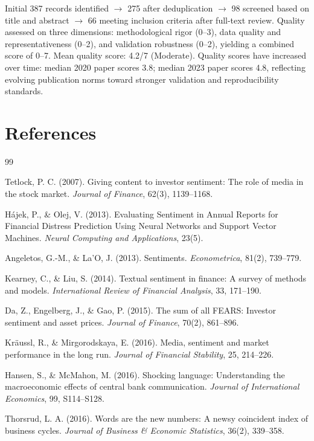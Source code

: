 \documentclass[11pt]{article}
\begin{document}
Initial 387 records identified $\to$ 275 after deduplication $\to$ 98 screened based on title and abstract $\to$ 66 meeting inclusion criteria after full-text review. Quality assessed on three dimensions: methodological rigor (0--3), data quality and representativeness (0--2), and validation robustness (0--2), yielding a combined score of 0--7. Mean quality score: 4.2/7 (Moderate). Quality scores have increased over time: median 2020 paper scores 3.8; median 2023 paper scores 4.8, reflecting evolving publication norms toward stronger validation and reproducibility standards.

\newpage
\section*{References}

\begin{thebibliography}{99}

 Tetlock, P. C. (2007). Giving content to investor sentiment: The role of media in the stock market. \textit{Journal of Finance}, 62(3), 1139--1168.

 Hájek, P., \& Olej, V. (2013). Evaluating Sentiment in Annual Reports for Financial Distress Prediction Using Neural Networks and Support Vector Machines. \textit{Neural Computing and Applications}, 23(5).

 Angeletos, G.-M., \& La'O, J. (2013). Sentiments. \textit{Econometrica}, 81(2), 739--779.

 Kearney, C., \& Liu, S. (2014). Textual sentiment in finance: A survey of methods and models. \textit{International Review of Financial Analysis}, 33, 171--190.

 Da, Z., Engelberg, J., \& Gao, P. (2015). The sum of all FEARS: Investor sentiment and asset prices. \textit{Journal of Finance}, 70(2), 861--896.

 Kräussl, R., \& Mirgorodskaya, E. (2016). Media, sentiment and market performance in the long run. \textit{Journal of Financial Stability}, 25, 214--226.

 Hansen, S., \& McMahon, M. (2016). Shocking language: Understanding the macroeconomic effects of central bank communication. \textit{Journal of International Economics}, 99, S114--S128.

 Thorsrud, L. A. (2016). Words are the new numbers: A newsy coincident index of business cycles. \textit{Journal of Business \& Economic Statistics}, 36(2), 339--358.


\end{thebibliography}
\end{document}
